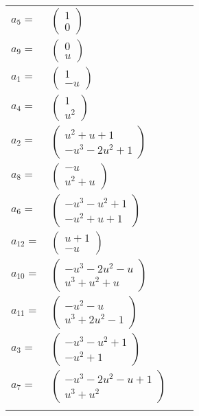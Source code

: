 \documentclass[1p]{elsarticle_modified}
\theoremstyle{definition}
\begin{document}
\begin{tabular}{m{7pt} m{180pt} m{7pt} m{180pt} }
\flushright $a_{5}=$&$\begin{pmatrix}1\\0\end{pmatrix}$ \\
\flushright $a_{9}=$&$\begin{pmatrix}0\\u\end{pmatrix}$ \\
\flushright $a_{1}=$&$\begin{pmatrix}1\\- u\end{pmatrix}$ \\
\flushright $a_{4}=$&$\begin{pmatrix}1\\u^2\end{pmatrix}$ \\
\flushright $a_{2}=$&$\begin{pmatrix}u^2+u+1\\- u^3-2 u^2+1\end{pmatrix}$ \\
\flushright $a_{8}=$&$\begin{pmatrix}- u\\u^2+u\end{pmatrix}$ \\
\flushright $a_{6}=$&$\begin{pmatrix}- u^3- u^2+1\\- u^2+u+1\end{pmatrix}$ \\
\flushright $a_{12}=$&$\begin{pmatrix}u+1\\- u\end{pmatrix}$ \\
\flushright $a_{10}=$&$\begin{pmatrix}- u^3-2 u^2- u\\u^3+u^2+u\end{pmatrix}$ \\
\flushright $a_{11}=$&$\begin{pmatrix}- u^2- u\\u^3+2 u^2-1\end{pmatrix}$ \\
\flushright $a_{3}=$&$\begin{pmatrix}- u^3- u^2+1\\- u^2+1\end{pmatrix}$ \\
\flushright $a_{7}=$&$\begin{pmatrix}- u^3-2 u^2- u+1\\u^3+u^2\end{pmatrix}$\\&\end{tabular}
\end{document}
